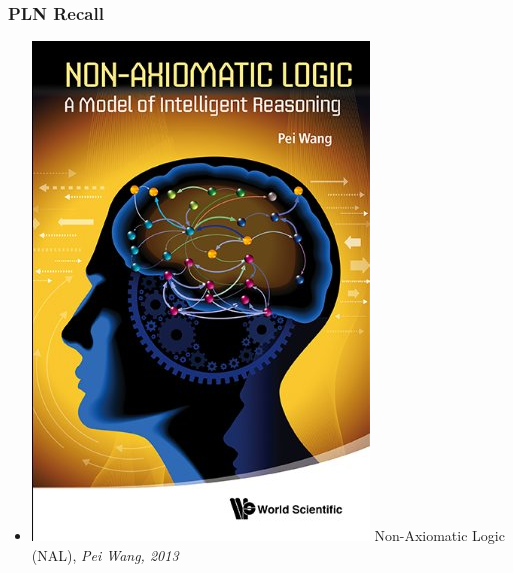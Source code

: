 \documentclass[aspectratio=169]{beamer}
\begin{document}
\begin{frame}
  \frametitle{PLN Recall}
  \begin{itemize}
  \item \includegraphics[scale=0.05]{figs/NAL.jpg} Non-Axiomatic Logic (NAL), \emph{Pei Wang, 2013}

\end{itemize}
\end{frame}
\end{document}
